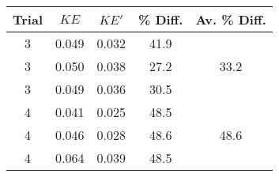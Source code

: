 \begin{tabular}{ | c | c c | c | c | } \hline
    Trial & $KE$ & $KE'$ & \% Diff. & Av. \% Diff. \\ \hline
    3 & 0.049 & 0.032 & 41.9 & \multirow{3}{*}{33.2} \\
    3 & 0.050 & 0.038 & 27.2 & \\
    3 & 0.049 & 0.036 & 30.5 & \\ \hline
    4 & 0.041 & 0.025 & 48.5 & \multirow{3}{*}{48.6} \\
    4 & 0.046 & 0.028 & 48.6 & \\
    4 & 0.064 & 0.039 & 48.5 & \\ \hline
\end{tabular}
